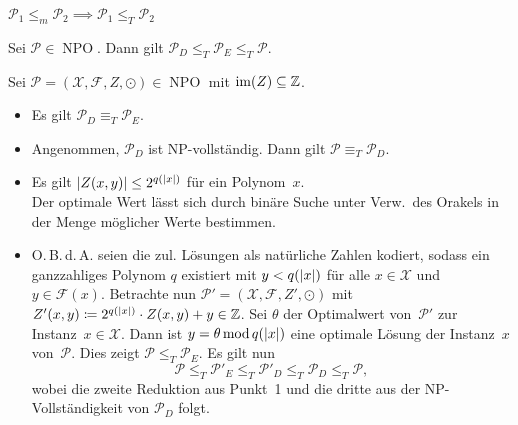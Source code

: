 \documentclass{cheat-sheet}
\newcommand{\Instances}{\mathcal{X}} %
\newcommand{\Feasible}{\mathcal{F}} %
\newcommand{\ObjFun}{Z} %
\newcommand{\Goal}{\odot} %
\newcommand{\OptTuple}{(\Instances{}, \Feasible{}, \ObjFun{}, \Goal)} %
\newcommand{\size}[1]{\abs{#1}} %
\DeclareMathOperator{\NPO}{NPO} %
\newcommand{\Prob}{\mathcal{P}} %
\newcommand{\ManyOneRed}{\leq_m} %
\newcommand{\TuringRed}{\leq_T} %
\newcommand{\TuringEq}{\equiv_T} %
\begin{document}
\begin{beob}
  $
    \Prob_1 \ManyOneRed \Prob_2 \implies
    \Prob_1 \TuringRed \Prob_2
  $
\end{beob}

\begin{beob}
  Sei $\Prob \in \NPO$.
  Dann gilt $\Prob_D \TuringRed \Prob_E \TuringRed \Prob$.
\end{beob}

\begin{satz}
  Sei $\Prob = \OptTuple \in \NPO$ mit $\operatorname{im}(Z) \subseteq \mathbb{Z}$.
  \begin{itemize}
    \item Es gilt $\Prob_D \TuringEq \Prob_E$.
    \item Angenommen, $\Prob_D$ ist NP-vollständig. Dann gilt $\Prob \TuringEq \Prob_D$.
  \end{itemize}
\end{satz}

\begin{beweisskizze}
  \begin{itemize}
    \item
      Es gilt $\abs{Z(x, y)} \leq 2^{q(\size{x})}$ für ein Polynom~$x$. \\
      Der optimale Wert lässt sich durch binäre Suche unter Verw.\ des Orakels in der Menge möglicher Werte bestimmen.
    \item
      O.\,B.\,d.\,A. seien die zul. Lösungen als natürliche Zahlen kodiert, sodass ein ganzzahliges Polynom $q$ existiert mit $y < q(\size{x})$ für alle $x \in \Instances{}$ und $y \in \Feasible(x)$.
      Betrachte nun $\Prob' = (\Instances{}, \Feasible{}, \ObjFun{}', \Goal{})$ mit $\ObjFun'(x, y) \coloneqq 2^{q(\size{x})} \cdot Z(x, y) + y \in \Z$.
      Sei $\theta$ der Optimalwert von~$\Prob'$ zur Instanz~$x \in \Instances$.
      Dann ist $y = \theta \,\mathrm{mod}\, q(\size{x})$ eine optimale Lösung der Instanz~$x$ von~$\Prob$.
      Dies zeigt $\Prob \TuringRed \Prob_E$.
      Es gilt nun
      \[
        \Prob \TuringRed
        \Prob'_E \TuringRed
        \Prob'_D \TuringRed
        \Prob_D \TuringRed
        \Prob,
      \]
      wobei die zweite Reduktion aus Punkt~1 und die dritte aus der NP-Vollständigkeit von $\Prob_D$ folgt.
  \end{itemize}
\end{beweisskizze}
\end{document}
